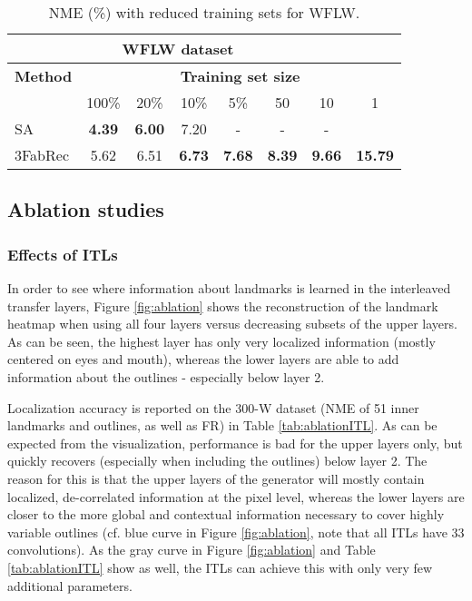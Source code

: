 \documentclass[10pt,twocolumn,letterpaper]{article}
\begin{document}
\begin{table}
	\footnotesize
	\begin{center}
		\begin{tabular}{l| c | c | c | c | c |c | c }
			
			\toprule
			\multicolumn{7}{c}{\bfseries  WFLW dataset}  \\
			\toprule
			\bfseries Method     &  \multicolumn{7}{c}{\bfseries  Training set size}  \\
&   100\%     &  20\%  &   10\%   &  5\% & 50 & 10  & 1  \\
			\toprule
			SA \cite{Honari2018} &   \bf 4.39  &  \bf 6.00  &   7.20   &  -    & -   &  -             \\
			\midrule
			3FabRec             &    5.62           &   6.51     & \bf 6.73  &  \bf 7.68   &  \bf 8.39    & \bf  9.66   & \bf 15.79     \\
			\midrule
			\bottomrule
		\end{tabular}	
	\end{center}
	\vspace{-0.5cm}
	\caption{\small NME (\%) with reduced training sets for WFLW.}	
	\label{tab:fewshotWFLW}
	\vspace{-0.0cm}
\end{table}

\subsection{Ablation studies}\label{sec:ablation}

\subsubsection{Effects of ITLs}\vspace{-0.1cm}
In order to see where information about landmarks is learned in the interleaved transfer layers, Figure \ref{fig:ablation} shows the reconstruction of the landmark heatmap when using all four layers versus decreasing subsets of the upper layers. As can be seen, the highest layer has only very localized information (mostly centered on eyes and mouth), whereas the lower layers are able to add information about the outlines - especially below layer 2. 

Localization accuracy is reported on the 300-W dataset (NME of 51 inner landmarks and outlines, as well as FR)  in Table \ref{tab:ablationITL}. As can be expected from the visualization, performance is bad for the upper layers only, but quickly recovers (especially when including the outlines) below layer 2. The reason for this is that the upper layers of the generator will mostly contain localized, de-correlated information at the pixel level, whereas the lower layers are closer to the more global and contextual information necessary to cover highly variable outlines (cf. blue curve in Figure \ref{fig:ablation}, note that all ITLs have 33 convolutions). As the gray curve in Figure \ref{fig:ablation} and Table \ref{tab:ablationITL} show as well, the ITLs can achieve this with only very few additional parameters.
\end{document}

